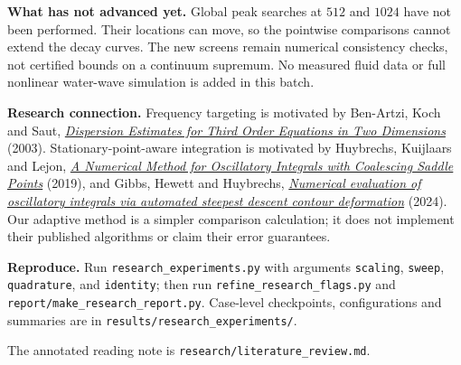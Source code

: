 \textbf{What has not advanced yet.} Global peak searches at $512$ and $1024$
have not been performed. Their locations can move, so the pointwise comparisons
cannot extend the decay curves. The new screens remain numerical consistency
checks, not certified bounds on a continuum supremum. No measured fluid data or
full nonlinear water-wave simulation is added in this batch.

\textbf{Research connection.} Frequency targeting is motivated by Ben-Artzi,
Koch and Saut, \href{https://doi.org/10.1081/PDE-120025491}{\emph{Dispersion Estimates
for Third Order Equations in Two Dimensions}} (2003). Stationary-point-aware
integration is motivated by Huybrechs, Kuijlaars and Lejon,
\href{https://arxiv.org/abs/1806.06549}{\emph{A Numerical Method for Oscillatory
Integrals with Coalescing Saddle Points}} (2019), and Gibbs, Hewett and Huybrechs,
\href{https://arxiv.org/abs/2307.07261}{\emph{Numerical evaluation of oscillatory
integrals via automated steepest descent contour deformation}} (2024).
Our adaptive method is a simpler comparison calculation; it does not implement
their published algorithms or claim their error guarantees.

\textbf{Reproduce.} Run \texttt{research\_experiments.py} with arguments
\texttt{scaling}, \texttt{sweep}, \texttt{quadrature}, and \texttt{identity}; then
run \texttt{refine\_research\_flags.py} and \texttt{report/make\_research\_report.py}.
Case-level checkpoints, configurations and summaries are in
\texttt{results/research\_experiments/}. \par The annotated reading note is \texttt{research/literature\_review.md}.
